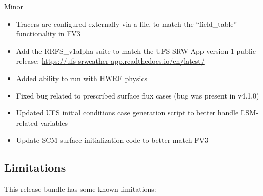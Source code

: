 Minor
\begin{itemize}
\item Tracers are configured externally via a file, to match the ``field\_table'' functionality in FV3
\item Add the RRFS\_v1alpha suite to match the UFS SRW App version 1 public release: \url{https://ufs-srweather-app.readthedocs.io/en/latest/}
\item Added ability to run with HWRF physics
\item Fixed bug related to prescribed surface flux cases (bug was present in v4.1.0)
\item Updated UFS initial conditions case generation script to better handle LSM-related variables
\item Update SCM surface initialization code to better match FV3
\end{itemize}

\subsection{Limitations}

This release bundle has some known limitations:

